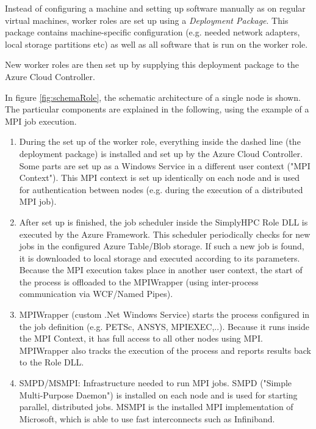 \documentclass[3p,times]{elsarticle}
\begin{document}
Instead of configuring a machine and setting up software manually as on regular virtual machines, worker roles are set up using a \textit{Deployment Package}. This package contains machine-specific configuration (e.g. needed network adapters, local storage partitions etc) as well as all software that is run on the worker role. 

New worker roles are then set up by supplying this deployment package to the Azure Cloud Controller.


In figure \ref{fig:schemaRole}, the schematic architecture of a single node is shown. The particular components are explained in the following, using the example of a MPI job execution.

\begin{enumerate}
	\item During the set up of the worker role, everything inside the dashed line (the deployment package) is installed and set up by the Azure Cloud Controller. Some parts are set up as a Windows Service in a different user context ("MPI Context"). This MPI context is set up identically on each node and is used for authentication between nodes (e.g. during the execution of a distributed MPI job).

	\item After set up is finished, the job scheduler inside the SimplyHPC Role DLL is executed by the Azure Framework. This scheduler periodically checks for new jobs in the configured Azure Table/Blob storage. If such a new job is found, it is downloaded to local storage and executed according to its parameters. Because the MPI execution takes place in another user context, the start of the process is offloaded to the MPIWrapper (using inter-process communication via WCF/Named Pipes).

	\item MPIWrapper (custom .Net Windows Service) starts the process configured in the job definition (e.g. PETSc, ANSYS, MPIEXEC,..). Because it runs inside the MPI Context, it has full access to all other nodes using MPI. MPIWrapper also tracks the execution of the process and reports results back to the Role DLL.

	\item SMPD/MSMPI: Infrastructure needed to run MPI jobs. SMPD ("Simple Multi-Purpose Daemon") is installed on each node and is used for starting parallel, distributed jobs. MSMPI is the installed MPI implementation of Microsoft, which is able to use fast interconnects such as Infiniband.
\end{enumerate}
\end{document}
